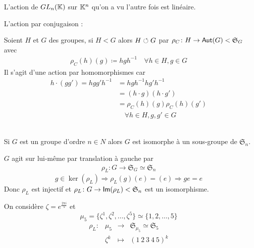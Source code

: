\documentclass[french,a4paper,10pt]{article}
\begin{document}
	\begin{myexample}
		L'action de $GL_n(\mathbb{K})$ sur $\mathbb{K}^n$ qu'on a vu l'autre fois est linéaire.
	\end{myexample}
	\begin{myexample}
		L'action par conjugaison :
		
		Soient $H$ et $G$ des groupes, si $H<G$ alors $H\circlearrowleft G$ par $\rho_C\colon H\to\operatorname{\mathsf{Aut}}(G)<\mathfrak{S}_G$ avec
			\[\begin{aligned}
				\rho_C(h)(g)\coloneq hgh^{-1}\quad\forall h\in H,g\in G
			\end{aligned}\]
		Il s'agit d'une action par homomorphismes car
			\[\begin{aligned}
				h\cdot(gg')=hgg'h^{-1}&=hgh^{-1}hg'h^{-1}\\
				&=(h\cdot g)(h\cdot g')\\
				&=\rho_C(h)(g) \rho_C(h)(g')\\&\quad\forall h\in H,g,g'\in G
			\end{aligned}\]
	\end{myexample}
	\begin{theorem}[Cayley]\,\\
		Si $G$ est un groupe d'ordre $n\in N$ alors $G$ est isomorphe à un sous-groupe de $\mathfrak S_n$.
	\end{theorem}
	\begin{myproof}
		$G$ agit sur lui-même par translation à gauche par 
			\[\begin{aligned}
				\rho_L\colon G\to \mathfrak S_G\simeq\mathfrak S_n
			\end{aligned}\]
			\[
			g\in \ker(\rho_L)\Longrightarrow\rho_L(g)(e)=(e)\Longrightarrow ge=e
			\]
			Donc $\rho_L$ est injectif et $\rho_L\colon G\to \operatorname{\mathsf{Im}}(\rho_L)<\mathfrak S_n$ est un isomorphisme.
	\end{myproof}
	\begin{myexample}
		On considère $\zeta=e^{\frac{2\pi i}5}$ et 
			\[
				\mu_5=\{\zeta^1,\zeta^2,\dots,\zeta^5\}\simeq\{1,2,\dots,5\}
			\]
			\[\begin{aligned}
				\rho_L\colon&\mu_5&\to &\mathfrak S_{\mu_5}\simeq\mathfrak S_5\\
				&\zeta^k&\mapsto &(1~2~3~4~5)^k
			\end{aligned}\]
	\end{myexample}
\end{document}
